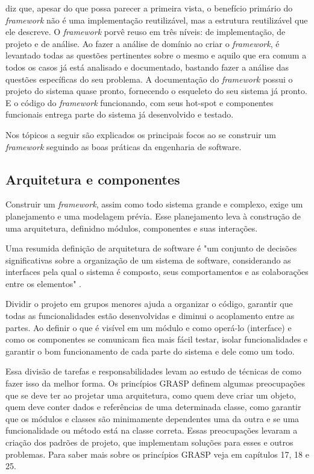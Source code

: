 \cite{Fayad1999} diz que, apesar do que possa parecer a primeira vista, o benefício primário do \textit{framework} não é uma implementação reutilizável, mas a estrutura reutilizável que ele descreve. O \textit{framework} porvê reuso em três níveis: de implementação, de projeto e de análise. Ao fazer a análise de domínio ao criar o \textit{framework}, é levantado todas as questões pertinentes sobre o mesmo e aquilo que era comum a todos os casos já está analisado e documentado, bastando fazer a análise das questões específicas do seu problema. A documentação do \textit{framework} possui o projeto do sistema quase pronto, fornecendo o esqueleto do seu sistema já pronto. E o código do \textit{framework} funcionando, com seus hot-spot e componentes funcionais entrega parte do sistema já desenvolvido e testado.

Nos tópicos a seguir são explicados os principais focos ao se construir um \textit{framework} seguindo as boas práticas da engenharia de software.

\subsection{Arquitetura e componentes}

Construir um \textit{framework}, assim como todo sistema grande e complexo, exige um planejamento e uma modelagem prévia. Esse planejamento leva à construção de uma arquitetura, definidno módulos, componentes e suas interações.

Uma resumida definição de arquitetura de software é "um conjunto de decisões significativas sobre a organização de um sistema de software, considerando as interfaces pela qual o sistema é composto, seus comportamentos e as colaborações entre os elementos" \cite{Larman2005}.

Dividir o projeto em grupos menores ajuda a organizar o código, garantir que todas as funcionalidades estão desenvolvidas e diminui o acoplamento entre as partes. Ao definir o que é visível em um módulo e como operá-lo (interface) e como os componentes se comunicam fica mais fácil testar, isolar funcionalidades e garantir o bom funcionamento de cada parte do sistema e dele como um todo.

Essa divisão de tarefas e responsabilidades levam ao estudo de técnicas de como fazer isso da melhor forma. Os princípios GRASP definem algumas preocupações que se deve ter ao projetar uma arquitetura, como quem deve criar um objeto, quem deve conter dados e referências de uma determinada classe, como garantir que os módulos e classes são minimamente dependentes uma da outra e se uma funcionalidade ou método está na classe correta. Essas preocupações levaram a criação dos padrões de projeto, que implementam soluções para esses e outros problemas. Para saber mais sobre os princípios GRASP veja em \cite{Larman2005} capítulos 17, 18 e 25.

